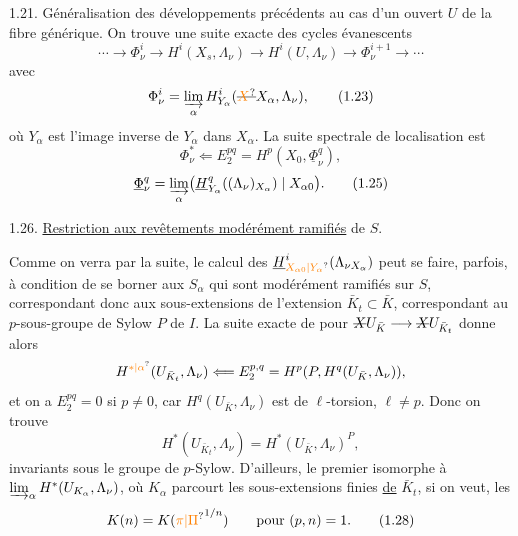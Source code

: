 1.21. Généralisation des développements précédents au cas d'un ouvert $U$ de la fibre générique.  On trouve une suite exacte des cycles évanescents
\[
\cdots\longrightarrow\Phi^i_\nu\longrightarrow H^i(X_s,\Lambda_\nu)\longrightarrow H^i(U,\Lambda_\nu)\longrightarrow\Phi^{i+1}_\nu\longrightarrow\cdots
\tag*{(1.22)}
\]
avec
\[
\Phi^i_\nu=\varinjlim_\alpha H^i_{Y_\alpha}(\deleted{\unsure{X}}X_\alpha,\Lambda_\nu),
\tag*{(1.23)}
\]
où $Y_\alpha$ est l'image inverse de $Y_\alpha$ dans $X_\alpha$. La suite spectrale de localisation est
\[
\Phi^*_\nu\Longleftarrow E_2^{pq}=H^p(X_0,\underline\Phi^q_\nu),
\tag*{(1.24).}
\]
\[
\underline\Phi^q_\nu=\varinjlim_\alpha\bigl(\underline H^q_{Y_\alpha}((\Lambda_\nu)_{X_\alpha})\mid X_{\alpha0}\bigr).
\tag*{(1.25)}
\]

1.26. \uline{Restriction aux revêtements modérément ramifiés} de $S$.

Comme on verra par la suite, le calcul des $\underline H^i_{\unsure{X_{\alpha0}|Y_\alpha}}(\Lambda_{\nu X_\alpha})$ peut se faire, parfois, à condition de se borner aux $S_\alpha$ qui sont modérément ramifiés sur $S$, correspondant donc aux  sous-extensions  de l'extension $\bar K_t\subset\bar K$,  correspondant au $p$-sous-groupe de Sylow $P$ de $I$.    La suite exacte de  pour $\deleted{X}U_{\bar K}\longrightarrow\deleted{X}U_{\bar K_t}$  donne alors
\[
H^{\unsure{*|\alpha}}(U_{\bar K_t},\Lambda_\nu)\Longleftarrow E_2^{p,q}=H^p(P,H^q(U_{\bar K},\Lambda_\nu)),
\]
et on a $E_2^{pq}=0$ si $p\ne0$, car $H^q(U_{\bar K},\Lambda_\nu)$ est de $\ell$-torsion, $\ell\ne p$. Donc on trouve
\[
H^*(U_{\bar K_t},\Lambda_\nu)=H^*(U_{\bar K},\Lambda_\nu)^P,
\tag*{(1.27)}
\]
invariants sous le groupe de $p$-Sylow. D'ailleurs, le premier  isomorphe à $\varinjlim_\alpha H^*(U_{K_\alpha},\Lambda_\nu)$, où $K_\alpha$ parcourt les sous-extensions finies \uline{de} $\bar K_t$,   si on veut, les
\[
K(n)=K({\unsure{\pi|\Pi}}^{1/n})\qquad\text{pour }(p,n)=1.
\tag*{(1.28)}
\]

